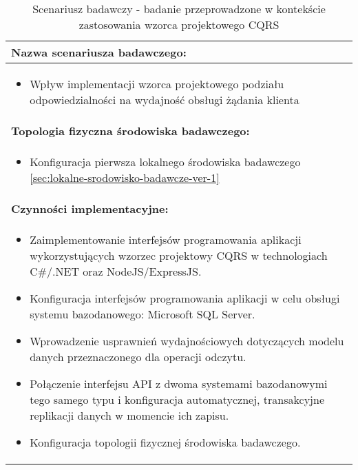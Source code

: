 \setlength{\LTcapwidth}{\textwidth}
\setlength\LTleft{0pt}
\setlength\LTright{0pt}
\begin{longtable}[c]{|llll|}
    \caption{Scenariusz badawczy - badanie przeprowadzone w kontekście zastosowania wzorca projektowego CQRS}
    \label{tab:research-scenario-4}                                                  \\ \hline
    \multicolumn{4}{|l|}{\textbf{Nazwa scenariusza badawczego:}}                     \\ \hline
    \multicolumn{4}{|p{\linewidth}|}{
        \begin{itemize}[label={}]
            \item Wpływ implementacji wzorca projektowego podziału odpowiedzialności na wydajność obsługi żądania klienta
          \end{itemize}
    } \\ \hline
    \multicolumn{4}{|l|}{\textbf{Topologia fizyczna środowiska badawczego:}}         \\ \hline
    \multicolumn{4}{|p{\linewidth}|}{
        \begin{itemize}[label={}]
            \item Konfiguracja pierwsza lokalnego środowiska badawczego \ref{sec:lokalne-srodowisko-badawcze-ver-1}
          \end{itemize}
    }\\ \hline
    \multicolumn{4}{|l|}{\textbf{Czynności implementacyjne:}}                        \\ \hline
    \multicolumn{4}{|p{\linewidth}|}{
        \begin{itemize}
            \item Zaimplementowanie interfejsów programowania aplikacji wykorzystujących wzorzec projektowy CQRS w technologiach C\#/.NET oraz NodeJS/ExpressJS.
            \item Konfiguracja interfejsów programowania aplikacji w celu obsługi systemu bazodanowego: Microsoft SQL Server.
            \item Wprowadzenie usprawnień wydajnościowych dotyczących modelu danych przeznaczonego dla operacji odczytu.
            \item Połączenie interfejsu API z dwoma systemami bazodanowymi tego samego typu i konfiguracja automatycznej, transakcyjne replikacji danych w momencie ich zapisu.
            \item Konfiguracja topologii fizycznej środowiska badawczego.

\end{itemize}}
\end{longtable}
